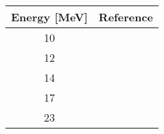 \begin{tabular}{c c} 
    \toprule
    \bf{Energy [MeV]} & \bf{Reference} \\
    \midrule
    10 & \cite{Anli1989}\\
    12 & \cite{Anli1989}\\
    14 & \cite{Anli1989}\\
    17 & \cite{Anli1989}\\
    23 & \cite{Lam1985}\\
    \bottomrule
\end{tabular}
